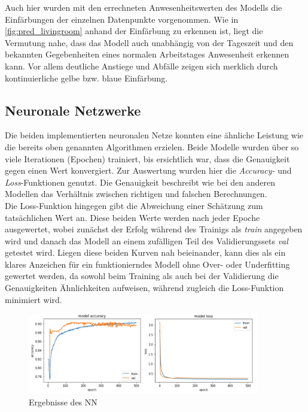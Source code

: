 Auch hier wurden mit den errechneten Anwesenheitswerten des Modells die Einfärbungen der einzelnen Datenpunkte 
vorgenommen. 
Wie in \ref{fig:pred_livingroom} anhand der Einfärbung zu erkennen ist, liegt die Vermutung nahe, dass das Modell 
auch unabhängig von der Tageszeit und den bekannten Gegebenheiten eines normalen Arbeitstages Anwesenheit 
erkennen kann. Vor allem deutliche Anstiege und Abfälle zeigen sich merklich durch kontinuierliche gelbe bzw. 
blaue Einfärbung.
\newpage

\subsection{Neuronale Netzwerke}
Die beiden implementierten neuronalen Netze konnten eine ähnliche Leistung wie die bereits oben genannten 
Algorithmen erzielen. Beide Modelle wurden über so viele Iterationen (Epochen) trainiert, bis ersichtlich war,
dass die Genauigkeit gegen einen Wert konvergiert. Zur Auswertung wurden hier die \textit{Accuracy-} und 
\textit{Loss}-Funktionen genutzt. Die Genauigkeit beschreibt wie bei den anderen Modellen das Verhältnis
zwischen richtigen und falschen Berechnungen.\\
Die Loss-Funktion hingegen gibt die Abweichung einer Schätzung zum tatsächlichen Wert an. Diese beiden Werte 
werden nach jeder Epoche ausgewertet, wobei zunächst der Erfolg während des Trainigs als \textit{train}
angegeben wird und danach das Modell an einem zufälligen Teil des Validierungssets \textit{val} getestet wird.
Liegen diese beiden Kurven nah beieinander, kann dies als ein klares Anzeichen für ein funktionierndes Modell ohne 
Over- oder Underfitting gewertet werden, da sowohl beim Training als auch bei der Validierung die Genauigkeiten 
Ähnlichkeiten aufweisen, während zugleich die Loss-Funktion minimiert wird.

\begin{figure}[h]
    \centering
    \includegraphics[width=0.9\textwidth]{pic/eval_NN.png}
    \caption{Ergebnisse des NN}
    \label{fig:eval_NN}
\end{figure}

